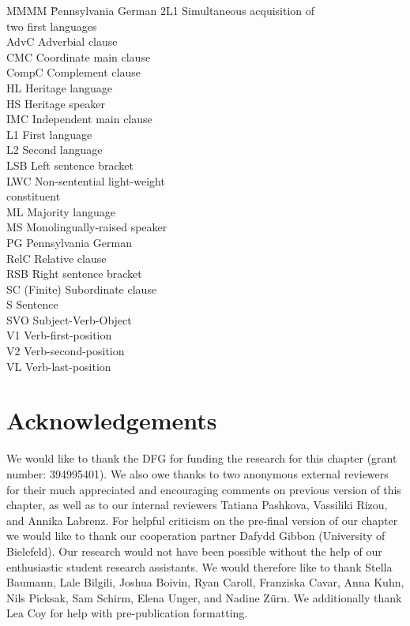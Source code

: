 \documentclass[output=paper]{langscibook}
\begin{document}
\begin{multicols}{2}
\begin{tabbing}
MMMM \= Pennsylvania German\kill
2L1 \> Simultaneous acquisition of \\ \> two first languages\\
AdvC \> Adverbial clause\\
CMC \> Coordinate main clause\\
CompC \> Complement clause\\
HL \> Heritage language\\
HS \> Heritage speaker\\
IMC \> Independent main clause\\
L1 \> First language\\
L2 \> Second language\\
LSB \> Left sentence bracket\\
LWC \> Non-sentential light-weight \\ \> constituent\\
ML \> Majority language\\
MS \> Monolingually-raised speaker\\
PG \> Pennsylvania German\\
RelC \> Relative clause\\
RSB \> Right sentence bracket\\
SC \> (Finite) Subordinate clause\\
S \> Sentence\\
SVO \> Subject-Verb-Object\\
V1 \> Verb-first-position\\
V2 \> Verb-second-position\\
VL \> Verb-last-position\\
\end{tabbing}
\end{multicols}

\renewcommand{\exfont}{\upshape}
\examplesroman
\section*{Acknowledgements}

We would like to thank the DFG for funding the research for this chapter (grant number: 394995401). We also owe thanks to two anonymous external reviewers for their much appreciated and encouraging comments on previous version of this chapter, as well as to our internal reviewers Tatiana Pashkova, Vassiliki Rizou, and Annika Labrenz. For helpful criticism on the pre-final version of our chapter we would like to thank our cooperation partner Dafydd Gibbon (University of Bielefeld). Our research would not have been possible without the help of our enthusiastic student research assistants. We would therefore like to thank Stella Baumann, Lale Bilgili, Joshua Boivin, Ryan Caroll, Franziska Cavar, Anna Kuhn, Nils Picksak, Sam Schirm, Elena Unger, and Nadine Zürn. We additionally thank Lea Coy for help with pre-publication formatting.

\printbibliography[heading=subbibliography,notkeyword=this]
\end{document}
